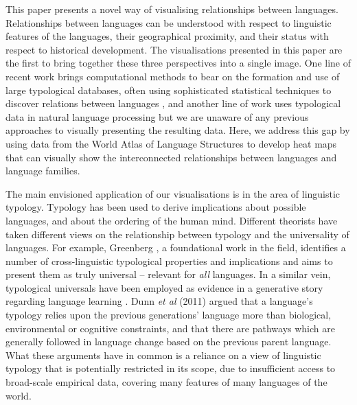 \documentclass[11pt]{article}
\begin{document}
This paper presents a novel way of visualising relationships between languages. Relationships between languages can be understood with respect to linguistic features of the languages, their geographical proximity, and their status with respect to historical development. The visualisations presented in this paper are the first to bring together these three perspectives into a single image. One line of recent work brings computational methods to bear on the formation and use of large typological databases, often using sophisticated statistical techniques to discover relations between languages \cite[among others]{cysouw2011,daume07implication,daume09areal}, and another line of work uses typological data in natural language processing \cite[for example]{xia:lewis, }but we are unaware of any previous approaches to visually presenting the resulting data.
Here, we address this gap by using data from the World Atlas of Language Structures \cite{wals-2011} to develop heat maps that can visually show the interconnected relationships between languages and language families. 

The main envisioned application of our visualisations is in the area of linguistic typology. Typology has been used to derive implications about possible languages, and about the ordering of the human mind. Different theorists have taken different views on the relationship between typology and the universality of languages. For example, Greenberg , a foundational work in the field, identifies a number of cross-linguistic typological properties and implications and aims to present them as truly universal -- relevant for \textit{all} languages. In a similar vein, typological universals have been employed as evidence in a generative story regarding language learning \cite{chomsky}.
Dunn {\it et al} (2011) %
argued that a language's typology relies upon the previous generations' language more than biological, environmental or cognitive constraints, and that there are pathways which are generally followed in language change based on the previous parent language. What these arguments have in common is a reliance on a view of linguistic typology that is potentially restricted in its scope, due to insufficient access to broad-scale empirical data, covering many features of many languages of the world. 
\end{document}
